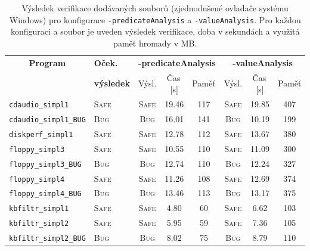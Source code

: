\documentclass[a4paper,12pt]{article}
\begin{document}
\noindent
\begin{table}[h!]
\renewcommand{\arraystretch}{1.2}
\begin{center}
  \begin{tabular}{| l | p{1.7cm} | c  c  c | c  c  c |}
    \hline
    \multicolumn{1}{|c|}{\bf Program} & {\small\bf Oček.} & \multicolumn{3}{c|}{\small\bf -predicateAnalysis} & \multicolumn{3}{c|}{\small\bf -valueAnalysis}  \\
     & {\small\bf výsledek}  & Výsl. & Čas\,[s] & Paměť & Výsl. & Čas\,[s] &  Paměť\\
    \hline\hline
    {\small \texttt{cdaudio\_simpl1}} & \textsc{Safe} & \textsc{Safe} & 19.46 & 117 & \textsc{Safe} & 19.85 & 407  \\ \hline
    {\small \texttt{cdaudio\_simpl1\_BUG}} & \textsc{Bug} & \textsc{Bug} & 16.01 & 141 & \textsc{Bug} & 10.19 & 199  \\ \hline
    {\small \texttt{diskperf\_simpl1}} & \textsc{Safe} & \textsc{Safe} & 12.78 & 112 & \textsc{Safe} & 13.67 & 380  \\ \hline
    {\small \texttt{floppy\_simpl3}} & \textsc{Safe} & \textsc{Safe} & 10.55 & 110 & \textsc{Safe} & 11.09 & 300 \\ \hline
    {\small \texttt{floppy\_simpl3\_BUG}} & \textsc{Bug} & \textsc{Bug} & 12.74 & 110 & \textsc{Bug} & 12.24 & 327  \\ \hline
    {\small \texttt{floppy\_simpl4}} & \textsc{Safe} & \textsc{Safe} & 11.26 & 108 & \textsc{Safe} & 12.69 & 374 \\ \hline
    {\small \texttt{floppy\_simpl4\_BUG}} & \textsc{Bug} & \textsc{Bug} & 13.46 & 113 & \textsc{Bug} & 13.17 & 375  \\ \hline
    {\small \texttt{kbfiltr\_simpl1}} & \textsc{Safe} & \textsc{Safe} & 4.80 & 60 & \textsc{Safe} & 6.62 & 103  \\ \hline
    {\small \texttt{kbfiltr\_simpl2}} & \textsc{Safe} & \textsc{Safe} & 5.95 & 59 & \textsc{Safe} & 7.36 & 105 \\ \hline
    {\small \texttt{kbfiltr\_simpl2\_BUG}} & \textsc{Bug} & \textsc{Bug} & 8.02 & 75 & \textsc{Bug} & 8.79 & 110  \\
    \hline
  \end{tabular}
\end{center}
\caption{Výsledek verifikace dodávaných souborů (zjednodušené ovladače systému Windows) pro konfigurace \texttt{-predicateAnalysis} a \texttt{-valueAnalysis}.
Pro každou konfiguraci a soubor je uveden výsledek verifikace, doba v sekundách a využitá paměť hromady v MB.}
\label{tab:res1}
\end{table}
\end{document}

